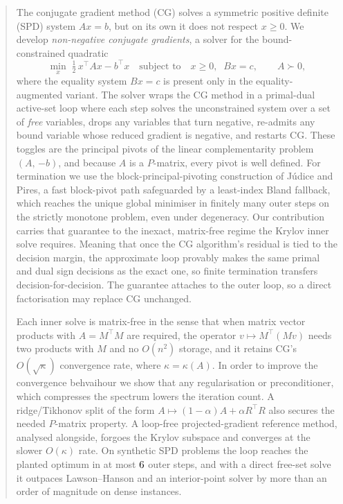 \begin{abstract}

The conjugate gradient method (CG) solves a symmetric positive definite (SPD) system $Ax = b$, but on its own it does not respect $x \geq 0$. We develop \emph{non-negative conjugate gradients}, a solver for the bound-constrained quadratic
\[
  \min_{x}\; \tfrac{1}{2}\,x^\top A x - b^\top x
  \quad\text{subject to}\quad x \geq 0,\;\; Bx = c,
  \qquad A \succ 0,
\]
where the equality system $Bx = c$ is present only in the equality-augmented variant.
The solver wraps the CG method in a primal-dual active-set loop where each step solves the unconstrained system
over a set of \emph{free} variables, drops any variables that turn negative, re-admits any bound variable whose reduced gradient is negative, and restarts CG. These toggles are the
principal pivots of the linear complementarity problem $(A,\,{-b})$, and because $A$ is a $P$-matrix,
every pivot is well defined. For termination we use the block-principal-pivoting
construction of Júdice and Pires, a fast block-pivot path safeguarded by a least-index Bland fallback, which
reaches the unique global minimiser in finitely many outer steps on the strictly monotone problem,
even under degeneracy. Our contribution carries that guarantee to the inexact,
matrix-free regime the Krylov inner solve requires. Meaning that once the CG algorithm's residual is tied to the decision margin,
the approximate loop provably makes the same primal and dual sign decisions as the exact one, so finite termination transfers decision-for-decision. The guarantee attaches to the outer loop, so a direct factorisation may replace CG unchanged.

Each inner solve is matrix-free in the sense that when matrix vector products with $A = M^\top M$ are required, the operator $v \mapsto M^\top(M v)$
needs two products with $M$ and no $O(n^2)$ storage, and it retains CG's $O(\sqrt\kappa)$ convergence rate, where $\kappa = \kappa(A)$. In order to improve the convergence behvaihour we show that any regularisation or preconditioner, which compresses the spectrum lowers the iteration count. A ridge/Tikhonov split of the form
$A \mapsto (1-\alpha)A + \alpha R^\top R$ also secures the needed $P$-matrix property. A loop-free projected-gradient reference method, analysed alongside, forgoes the Krylov subspace and converges at the slower $O(\kappa)$ rate. On synthetic SPD problems the loop reaches the planted optimum in at most $\nncgMaxOuter{}$ outer steps, and with a direct free-set solve it
outpaces Lawson--Hanson and an interior-point solver by more than an order of magnitude on dense instances.
\end{abstract}
